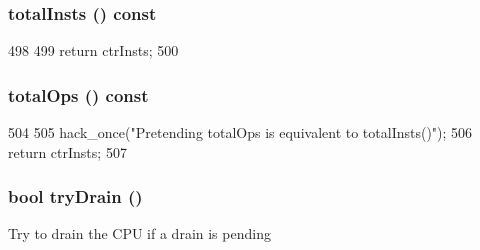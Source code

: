 \hypertarget{classBaseKvmCPU_a7e01d94bb5a6e15fa8c94bcdf276115d}{
\subsubsection[{totalInsts}]{ totalInsts () const}}
\label{classBaseKvmCPU_a7e01d94bb5a6e15fa8c94bcdf276115d}



\begin{DoxyCode}
498 {
499     return ctrInsts;
500 }
\end{DoxyCode}
\hypertarget{classBaseKvmCPU_a76fa5df6827aaa8fc26deebad97d9e78}{
\subsubsection[{totalOps}]{ totalOps () const}}
\label{classBaseKvmCPU_a76fa5df6827aaa8fc26deebad97d9e78}



\begin{DoxyCode}
504 {
505     hack_once("Pretending totalOps is equivalent to totalInsts()\n");
506     return ctrInsts;
507 }
\end{DoxyCode}
\hypertarget{classBaseKvmCPU_a250ca18dfc0316e340eaa2ec45d73c3e}{
\subsubsection[{tryDrain}]{\setlength{\rightskip}{0pt plus 5cm}bool tryDrain ()}}
\label{classBaseKvmCPU_a250ca18dfc0316e340eaa2ec45d73c3e}
Try to drain the CPU if a drain is pending 


